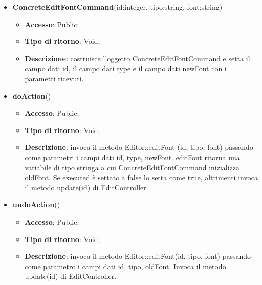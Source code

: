 {{{	
	\begin{itemize}
		\item \textbf{ConcreteEditFontCommand}(id:integer, tipo:string, font:string)
		\begin{itemize}
			\item \textbf{Accesso}: Public;
			\item \textbf{Tipo di ritorno}: Void;
			\item \textbf{Descrizione}: costruisce l’oggetto ConcreteEditFontCommand e setta il campo dati id, il campo dati type e il campo dati newFont con i parametri ricevuti.
		\end{itemize}
		\item \textbf{doAction}()
		\begin{itemize}
			\item \textbf{Accesso}: Public;
			\item \textbf{Tipo di ritorno}: Void;
			\item \textbf{Descrizione}: invoca il metodo Editor::editFont (id, tipo, font) passando come parametri i campi dati id, type, newFont. editFont ritorna una variabile di tipo stringa a cui ConcreteEditFontCommand inizializza oldFont. Se executed è settato a false lo setta come true, altrimenti invoca il metodo update(id) di EditController.
		\end{itemize}
		\item \textbf{undoAction}()
		\begin{itemize}
			\item \textbf{Accesso}: Public;
			\item \textbf{Tipo di ritorno}: Void;
			\item \textbf{Descrizione}: invoca il metodo Editor::editFont(id, tipo, font) passando come parametro i campi dati id, tipo, oldFont. Invoca il metodo update(id) di EditController.
		\end{itemize}
	\end{itemize}
	}
}
}
